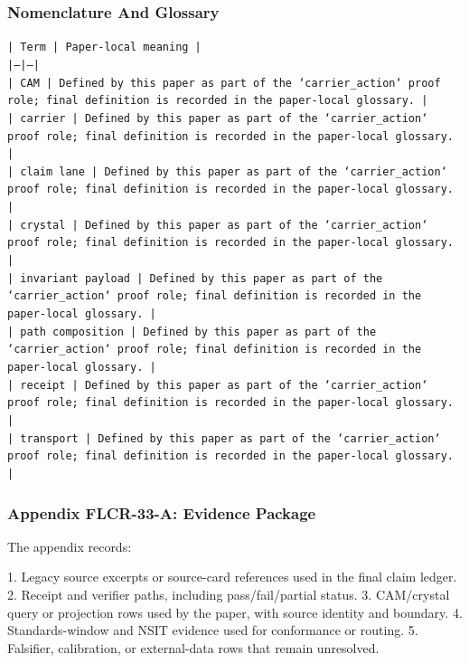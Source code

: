 \documentclass[11pt]{article}
\begin{document}
\subsubsection*{Nomenclature And Glossary}

\noindent\texttt{| Term | Paper-local meaning |}\\
\noindent\texttt{|---|---|}\\
\noindent\texttt{| CAM | Defined by this paper as part of the `carrier\_action` proof role; final definition is recorded in the paper-local glossary. |}\\
\noindent\texttt{| carrier | Defined by this paper as part of the `carrier\_action` proof role; final definition is recorded in the paper-local glossary. |}\\
\noindent\texttt{| claim lane | Defined by this paper as part of the `carrier\_action` proof role; final definition is recorded in the paper-local glossary. |}\\
\noindent\texttt{| crystal | Defined by this paper as part of the `carrier\_action` proof role; final definition is recorded in the paper-local glossary. |}\\
\noindent\texttt{| invariant payload | Defined by this paper as part of the `carrier\_action` proof role; final definition is recorded in the paper-local glossary. |}\\
\noindent\texttt{| path composition | Defined by this paper as part of the `carrier\_action` proof role; final definition is recorded in the paper-local glossary. |}\\
\noindent\texttt{| receipt | Defined by this paper as part of the `carrier\_action` proof role; final definition is recorded in the paper-local glossary. |}\\
\noindent\texttt{| transport | Defined by this paper as part of the `carrier\_action` proof role; final definition is recorded in the paper-local glossary. |}\\

\subsubsection*{Appendix FLCR-33-A: Evidence Package}

The appendix records:

1. Legacy source excerpts or source-card references used in the final claim ledger.
2. Receipt and verifier paths, including pass/fail/partial status.
3. CAM/crystal query or projection rows used by the paper, with source identity and boundary.
4. Standards-window and NSIT evidence used for conformance or routing.
5. Falsifier, calibration, or external-data rows that remain unresolved.
\end{document}
